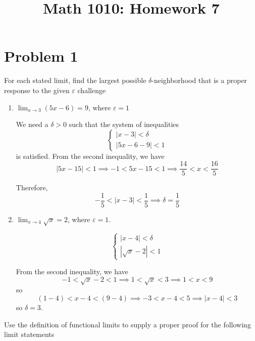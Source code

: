 \documentclass[12pt]{article}
\title{Math 1010: Homework 7}
\author{}
\date{}
\newcommand{\abs}[1]{\left\vert #1 \right\vert}
\begin{document}
\maketitle
\vspace*{-1in}

\section*{Problem 1 }
For each stated limit, find the largest possible $\delta$-neighborhood that is a proper response to the given $\varepsilon$ challenge
\begin{enumerate}
	\item $\lim_{x\to 3}(5x-6)=9$, where $\varepsilon=1$
	
        \color{blue}
            We need a $\delta > 0$ such that the system of inequalities
            \[\begin{cases}
                \abs{x - 3} < \delta\\ 
                \abs{5x - 6 - 9} < 1
            \end{cases}\]
            is satisfied. From the second inequality, we have 
            \[\abs{5x - 15} < 1 \implies -1 < 5x - 15 < 1 \implies \frac{14}{5} < x < \frac{16}{5}\]

            Therefore, 
            \[-\frac{1}{5} < \abs{x - 3} < \frac{1}{5} \implies \boxed{\delta = \frac{1}{5}}\]
                
        \color{black}

	\item $\lim_{x\to 4}\sqrt{x}=2$, where $\varepsilon=1$. 
            
        \color{blue}
            \[\begin{cases}
                \abs{x - 4} < \delta\\ 
                \abs{\sqrt{x} - 2} < 1
            \end{cases}\]

            From the second inequality, we have
            \[-1 < \sqrt{x} - 2 < 1 \implies 1 < \sqrt{x} < 3 \implies 1 < x < 9\]
            so 
            \[(1 - 4) < x - 4 < (9 - 4) \implies -3 < x - 4 < 5 \implies \abs{x - 4} < 3\]
            so $\boxed{\delta = 3}$. 

        \color{black}

\end{enumerate}
Use the definition of functional limits to supply a proper proof for the following limit statements
\end{document}
